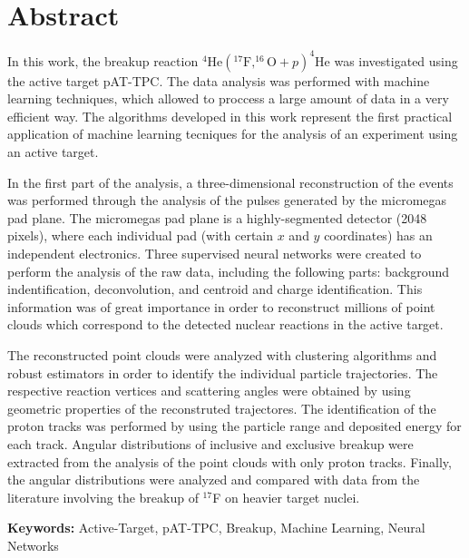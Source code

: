 \documentclass[a4paper,12pt,oneside]{book}
\begin{document}
\chapter*{Abstract}
\thispagestyle{empty}
\par In this work, the breakup reaction $^4\mathrm{He}(^{17}\mathrm{F},^{16}\mathrm{O}+p)^4\mathrm{He}$ was investigated using the active target pAT-TPC. The data analysis was performed with machine learning techniques, which allowed to proccess a large amount of data in a very efficient way. The algorithms developed in this work represent the first practical application of machine learning tecniques for the analysis of an experiment using an active target.

\par In the first part of the analysis, a three-dimensional reconstruction of the events was performed through the analysis of the pulses generated by the micromegas pad plane. The micromegas pad plane is a highly-segmented detector (2048 pixels), where each individual pad (with certain $x$ and $y$ coordinates) has an independent electronics. Three supervised neural networks were created to perform the analysis of the raw data, including the following parts: background indentification, deconvolution, and centroid and charge identification. This information was of great importance in order to reconstruct millions of point clouds which correspond to the detected nuclear reactions in the active target.

\par The reconstructed point clouds were analyzed with clustering algorithms and robust estimators in order to identify the individual particle trajectories. The respective reaction vertices and scattering angles were obtained by using geometric properties of the reconstruted trajectores. The identification of the proton tracks was performed by using the particle range and deposited energy for each track. Angular distributions of inclusive and exclusive breakup were extracted from the analysis of the point clouds with only proton tracks. Finally, the angular distributions were analyzed and compared with data from the literature involving the breakup of $^{17}$F on heavier target nuclei.
\par \textbf{Keywords:} Active-Target, pAT-TPC, Breakup, Machine Learning, Neural Networks

\newpage

\tableofcontents
\thispagestyle{empty}
\newpage
\end{document}
